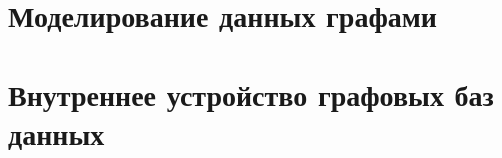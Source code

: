 \section{Моделирование данных графами}


\section{Внутреннее устройство графовых баз данных}

%
%
%
%
%
%
